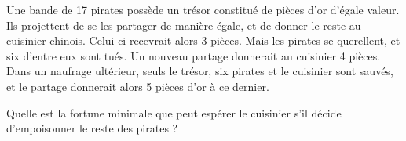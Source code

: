 \begin{enigme}

  Une bande de 17 pirates possède un trésor constitué de pièces d'or d'égale valeur. Ils projettent de se les partager de manière égale, et de donner le reste au cuisinier chinois. Celui-ci recevrait alors 3 pièces. Mais les pirates se querellent, et six d'entre eux sont tués. Un nouveau partage donnerait au cuisinier 4 pièces. Dans un naufrage ultérieur, seuls le trésor, six pirates et le cuisinier sont sauvés, et le partage donnerait alors 5 pièces d'or à ce dernier.

Quelle est la fortune minimale que peut espérer le cuisinier s'il décide d'empoisonner le reste des pirates ?\vspace{0.5cm}

\end{enigme}